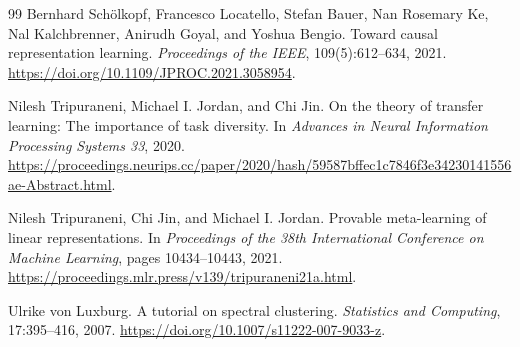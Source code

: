 \documentclass[11pt,twoside]{article}
\theoremstyle{definition}
\theoremstyle{remark}
\begin{document}
\begin{thebibliography}{99}
Bernhard Sch\"olkopf, Francesco Locatello, Stefan Bauer, Nan Rosemary Ke,
Nal Kalchbrenner, Anirudh Goyal, and Yoshua Bengio.
\newblock Toward causal representation learning.
\newblock \emph{Proceedings of the IEEE}, 109(5):612--634, 2021.
\newblock \url{https://doi.org/10.1109/JPROC.2021.3058954}.

Nilesh Tripuraneni, Michael I. Jordan, and Chi Jin.
\newblock On the theory of transfer learning: The importance of task diversity.
\newblock In \emph{Advances in Neural Information Processing Systems 33}, 2020.
\newblock \url{https://proceedings.neurips.cc/paper/2020/hash/59587bffec1c7846f3e34230141556ae-Abstract.html}.

Nilesh Tripuraneni, Chi Jin, and Michael I. Jordan.
\newblock Provable meta-learning of linear representations.
\newblock In \emph{Proceedings of the 38th International Conference on
Machine Learning}, pages 10434--10443, 2021.
\newblock \url{https://proceedings.mlr.press/v139/tripuraneni21a.html}.

Ulrike von Luxburg.
\newblock A tutorial on spectral clustering.
\newblock \emph{Statistics and Computing}, 17:395--416, 2007.
\newblock \url{https://doi.org/10.1007/s11222-007-9033-z}.

\end{thebibliography}
\end{document}
